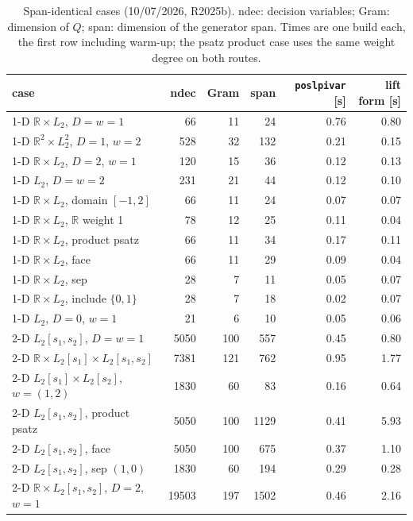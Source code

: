 \documentclass[12pt]{article}
\newcommand{\R}{\mathbb{R}}
\newcommand{\code}[1]{\texttt{#1}}
\theoremstyle{plain}
\theoremstyle{definition}
\theoremstyle{remark}
\begin{document}
\begin{table}[h]\centering\footnotesize
\setlength{\tabcolsep}{4pt}
\begin{tabular}{lrrrrr}
\toprule
case & ndec & Gram & span & \code{poslpivar} [s] & lift form [s] \\
\midrule
1-D $\R\times L_2$, $D=w=1$ & 66 & 11 & 24 & 0.76 & 0.80 \\
1-D $\R^2\times L_2^2$, $D=1$, $w=2$ & 528 & 32 & 132 & 0.21 & 0.15 \\
1-D $\R\times L_2$, $D=2$, $w=1$ & 120 & 15 & 36 & 0.12 & 0.13 \\
1-D $L_2$, $D=w=2$ & 231 & 21 & 44 & 0.12 & 0.10 \\
1-D $\R\times L_2$, domain $[-1,2]$ & 66 & 11 & 24 & 0.07 & 0.07 \\
1-D $\R\times L_2$, $\R$ weight 1 & 78 & 12 & 25 & 0.11 & 0.04 \\
1-D $\R\times L_2$, product psatz & 66 & 11 & 34 & 0.17 & 0.11 \\
1-D $\R\times L_2$, face & 66 & 11 & 29 & 0.09 & 0.04 \\
1-D $\R\times L_2$, sep & 28 & 7 & 11 & 0.05 & 0.07 \\
1-D $\R\times L_2$, include $\{0,1\}$ & 28 & 7 & 18 & 0.02 & 0.07 \\
1-D $L_2$, $D=0$, $w=1$ & 21 & 6 & 10 & 0.05 & 0.06 \\
2-D $L_2[s_1,s_2]$, $D=w=1$ & 5050 & 100 & 557 & 0.45 & 0.80 \\
2-D $\R\times L_2[s_1]\times L_2[s_1,s_2]$ & 7381 & 121 & 762 & 0.95 & 1.77 \\
2-D $L_2[s_1]\times L_2[s_2]$, $w=(1,2)$ & 1830 & 60 & 83 & 0.16 & 0.64 \\
2-D $L_2[s_1,s_2]$, product psatz & 5050 & 100 & 1129 & 0.41 & 5.93 \\
2-D $L_2[s_1,s_2]$, face & 5050 & 100 & 675 & 0.37 & 1.10 \\
2-D $L_2[s_1,s_2]$, sep $(1,0)$ & 1830 & 60 & 194 & 0.29 & 0.28 \\
2-D $\R\times L_2[s_1,s_2]$, $D=2$, $w=1$ & 19503 & 197 & 1502 & 0.46 & 2.16 \\
\bottomrule
\end{tabular}
\caption{Span-identical cases (10/07/2026, R2025b). ndec: decision variables; Gram: dimension of $Q$; span: dimension of the generator span. Times are one build each, the first row including warm-up; the psatz product case uses the same weight degree on both routes.}\label{tab:cases}
\end{table}
\end{document}
